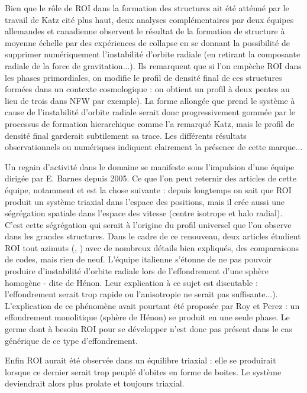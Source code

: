 Bien que le r\^{o}le de ROI dans la formation des structures ait été atténué par le travail de Katz \cite{katz} cit\'{e} plus haut, deux analyses
compl\'{e}mentaires par deux \'{e}quipes allemandes \cite{huss} et canadienne \cite{macmillan} observent le r\'{e}sultat de la formation de structure à moyenne \'{e}chelle par des exp\'{e}riences de collapse en se donnant la possibilit\'{e} de supprimer numériquement l'instabilit\'{e} d'orbite radiale (en retirant la composante radiale de la force de gravitation...). 
Ils remarquent que si l'on empèche ROI dans les phases primordiales, on modifie le profil de densité final de ces structures formées dans un contexte cosmologique : on obtient un profil à deux pentes au lieu de trois dans NFW par exemple). La forme allongée que prend le système à cause de l'instabilité d'orbite radiale serait donc progressivement gommée par le processus de formation hierarchique comme l'a remarqué Katz, mais le profil de densité final garderait subtilement sa trace. Les différents résultats observationnels ou numériques indiquent clairement la présence de cette marque...   

Un regain d'activit\'{e} dans le domaine se manifeste sous l'impulsion d'une
\'{e}quipe dirig\'{e}e par E. Barnes depuis 2005. Ce que l'on peut reternir des articles de cette équipe, notamment \cite{barnes2005} et \cite{ROI_Moderne} est la chose suivante : depuis longtemps on
sait que ROI produit un syst\`{e}me triaxial dans l'espace des positions, mais
il cr\'{e}e aussi une s\'{e}gr\'{e}gation spatiale dans l'espace des vitesse
(centre isotrope et halo radial). C'est cette s\'{e}gr\'{e}gation qui serait
\`{a} l'origine du profil universel que l'on observe dans les grandes
structures. Dans le cadre de ce renouveau, deux articles
\'{e}tudient ROI tout azimuts (\cite{barneslanzel}, \cite{trenti}) avec de nombreux d\'{e}tails 
bien expliqu\'{e}s, des comparaisons de codes,  mais rien de neuf.  L'équipe italienne \cite{trenti} s'\'{e}tonne de ne pas pouvoir produire d'instabilité d'orbite radiale lors de l'effondrement d'une sphère homogène - dite de Hénon. Leur explication à ce sujet est discutable  : l'effondrement serait trop rapide ou l'anisotropie ne serait pas suffisante...). L'explication de ce ph\'{e}nom\`{e}ne avait pourtant \'{e}t\'{e} propos\'{e}e par Roy et Perez \cite{roy} : un effondrement monolitique (sphère de Hénon) se produit en une seule phase.  Le germe dont à besoin ROI pour se développer n'est donc pas présent dans le cas générique de ce type d'effondrement. 


Enfin ROI aurait \'{e}t\'{e} observ\'{e}e dans un \'{e}quilibre triaxial
\cite{antonini} : elle se produirait lorsque ce dernier serait trop peupl\'{e} d'obites en forme de boites. Le syst\`{e}me deviendrait
alors plus prolate et toujours triaxial.



